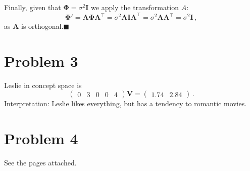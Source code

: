 \documentclass{scrartcl}
\newcommand{\qed}{\hfill $\blacksquare$}
\begin{document}
Finally, given that $\bm{\Phi} = \sigma^2 \mathbf{I}$ we apply the transformation $A$:
\begin{equation}
	\bm{\Phi}' = \mathbf{A}\bm{\Phi} \mathbf{A}^\top = \sigma^2 \mathbf{AIA}^\top = \sigma^2 \mathbf{AA}^\top = \sigma^2 \mathbf{I} \, , 
\end{equation}
as $\mathbf{A}$ is orthogonal.\qed


\section{Problem 3} %
\label{sec:problem_3}
Leslie in concept space is
\begin{equation}
	\begin{pmatrix}
		0&3&0&0&4
	\end{pmatrix}\mathbf{V} = \begin{pmatrix}
		1.74 & 2.84
	\end{pmatrix}\, .
\end{equation}
Interpretation: Leslie likes everything, but has a tendency to romantic movies.


\section{Problem 4} %
\label{sec:problem_4}
See the pages attached.


	
\end{document}
